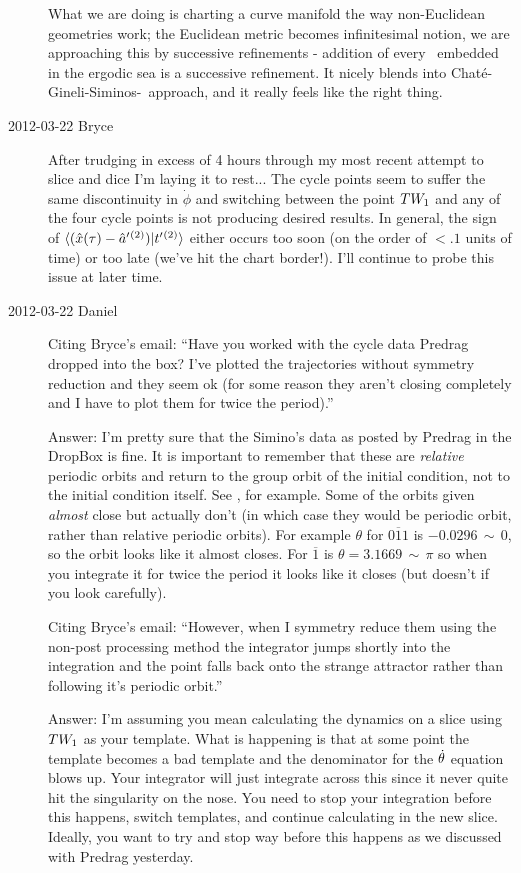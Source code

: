 \begin{description}
What we are doing is charting a curve manifold the way non-Euclidean
geometries work; the Euclidean metric becomes infinitesimal notion, we
are approaching this by successive refinements - addition of every \po\
embedded in the ergodic sea is a successive refinement. It nicely blends
into Chat\'e-Gineli-Siminos-\etal\ approach, and it really feels like the
right thing.

\item[2012-03-22 Bryce]
After trudging in excess of 4 hours through my most recent attempt to
slice and dice I'm laying it to rest... The cycle points seem to suffer
the same discontinuity in $\dot{\phi}$ and switching between the
{\reqv} point $TW_{1}$ and any of the four cycle points is not
producing desired results. In general, the sign of
$\langle(\hat{x}(\tau)- \hat{a}'{}^{(2)})|t'_{}{}^{(2)}\rangle$
either occurs too soon (on the order of $<.1$ units of time)  or too late
(we've hit the chart border!). I'll continue to probe this issue at later
time.


\item[2012-03-22 Daniel~~]
Citing Bryce's email: ``Have you worked with the cycle data Predrag
dropped into the box? I've plotted the trajectories without symmetry
reduction and they seem ok (for some reason they aren't closing
completely and I have to plot them for twice the period).''

Answer: I'm pretty sure that the Simino's data as posted by Predrag in
the DropBox is fine. It is important to remember that these are
\emph{relative} periodic orbits and return to the group orbit of the
initial condition, not to the initial condition itself. See
, for example. Some of the orbits given
\emph{almost} close but actually don't (in which case they would be
periodic orbit, rather than relative periodic orbits). For example
$\theta$ for $\overline{011}$ is $-0.0296\, \sim \,0$, so the orbit looks
like it almost closes. For $\overline{1}$ is $\theta = 3.1669\, \sim
\,\pi$ so when you integrate it for twice the period it looks like it
closes (but doesn't if you look carefully).

Citing Bryce's email: ``However, when I symmetry reduce them using the
non-post processing method the integrator jumps shortly into the
integration and the point falls back onto the strange attractor rather
than following it's periodic orbit.''

Answer: I'm assuming you mean calculating the dynamics  on a slice using
$TW_{1}$ as your template. What is happening is that at some point the
template becomes a bad template and the denominator for the {\phaseVel}
$\dot{\theta}$ equation blows up. Your integrator will just integrate
across this since it never quite hit the singularity on the nose. You
need to stop your integration before this happens, switch templates, and
continue calculating in the new slice. Ideally, you want to try and stop
way before this happens as we discussed with Predrag yesterday.


\end{description}
